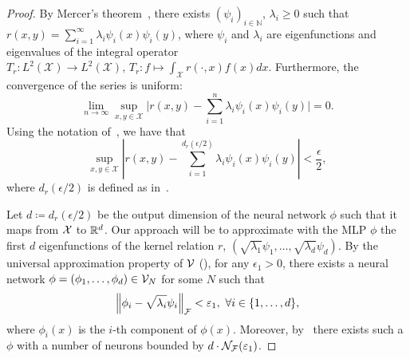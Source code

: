 \begin{proof}
	By Mercer's theorem~\parencite{mercerFunctionsPositive1909, sunMercerTheorem2005, micchelliUniversalKernels2006}, there exists $(\psi_i)_{i \in \mathbb{N}}$, $\lambda_i \geq 0$ such that $r(x,y) = \sum_{i=1}^{\infty}{\lambda_i \psi_i(x) \psi_i(y)}$, where $\psi_i$ and $\lambda_i$ are eigenfunctions and eigenvalues of the integral operator $T_r: L^2(\mathcal{X}) \to L^2(\mathcal{X}),\,T_r: f \mapsto \int_{\mathcal{X}}{r(\cdot, x) f(x) dx}$.
	Furthermore, the convergence of the series is uniform:
	\begin{equation}
		\lim_{n \to \infty} \sup_{x,y \in \mathcal{X}} \lvert r(x,y) - \sum_{i=1}^{n}{\lambda_i \psi_i(x) \psi_i(y) \rvert} = 0.
	\end{equation}
	Using the notation of~, we have that
	\begin{equation}\label{eq:proof_mercer_thm_unif_abs_cv}
		\sup_{x,y \in \mathcal{X}} \left\lvert r(x,y) - \sum_{i=1}^{d_r(\epsilon/2)}{\lambda_i \psi_i(x) \psi_i(y)} \right\rvert < \frac{\epsilon}{2},
	\end{equation}
	where $d_r(\epsilon/2)$ is defined as in~.

	Let $d \coloneqq d_r(\epsilon / 2)$ be the output dimension of the neural network $\phi$ such that it maps from ${\mathcal{X}}$ to $\mathbb{R}^d$. Our approach will be to approximate with the MLP $\phi$ the first $d$ eigenfunctions of the kernel relation $r$, $(\sqrt{\lambda_1} \psi_1, \ldots, \sqrt{\lambda_{d}} \psi_{d})$.
	By the universal approximation property of ${\mathcal{V}}$ (), for any $\epsilon_1 > 0$, there exists a neural network $\phi = (\phi_1, \ldots, \phi_d) \in {\mathcal{V}}_N$ for some $N$ such that
	\begin{equation}\label{eq:proof_NN_UAP}
		\norm{\phi_i - \sqrt{\lambda_i} \psi_i}_\calF < \epsilon_1, \ \forall i \in \{1, \ldots, d\},
	\end{equation}
	where $\phi_i(x)$ is the $i$-th component of $\phi(x)$. Moreover, by~ there exists such a $\phi$ with a number of neurons bounded by $d \cdot {\mathcal{N}}_{\mathcal{F}}(\varepsilon_1)$.


\end{proof}
